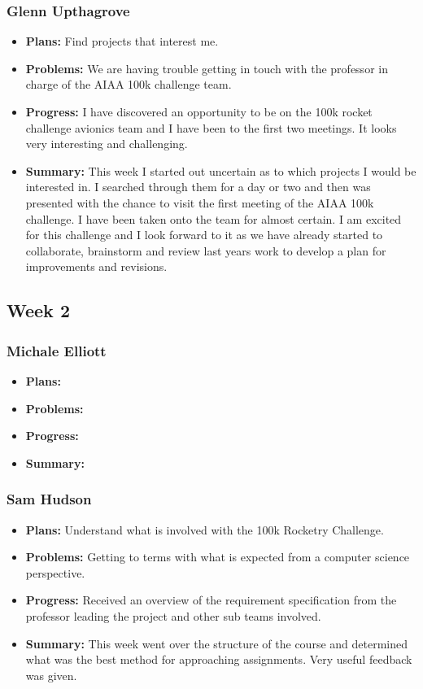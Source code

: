 \documentclass[onecolumn, draftclsnofoot,10pt, compsoc]{IEEEtran}
\begin{document}
\subsubsection{Glenn Upthagrove}
\begin {itemize}
 \item \textbf{Plans: }Find projects that interest me. 
 \item \textbf{Problems: }We are having trouble getting in touch with the professor in charge of the AIAA 100k challenge team. 
 \item \textbf{Progress: }I have discovered an opportunity to be on the 100k rocket challenge avionics team and I have been to the first two meetings. It looks very interesting and challenging.  
 \item \textbf{Summary: }This week I started out uncertain as to which projects I would be interested in. I searched through them for a day or two and then was presented with the chance to visit the first meeting of the AIAA 100k challenge. I have been taken onto the team for almost certain. I am excited for this challenge and I look forward to it as we have already started to collaborate, brainstorm and review last years work to develop a plan for improvements and revisions.  
\end {itemize}
\subsection {Week 2}
\subsubsection{Michale Elliott}
\begin {itemize}
 \item \textbf{Plans: }
 \item \textbf{Problems: }
 \item \textbf{Progress: }
 \item \textbf{Summary: }
\end {itemize}
\subsubsection{Sam Hudson}
\begin {itemize}
\item \textbf{Plans: }Understand what is involved with the 100k Rocketry Challenge.
\item \textbf{Problems: }Getting to terms with what is expected from a computer science perspective. 
\item \textbf{Progress: }Received an overview of the requirement specification from the professor leading the project and other sub teams involved.
\item \textbf{Summary: }This week went over the structure of the course and determined what was the best method for approaching assignments. Very useful feedback was given.
\end {itemize}
\end{document}
